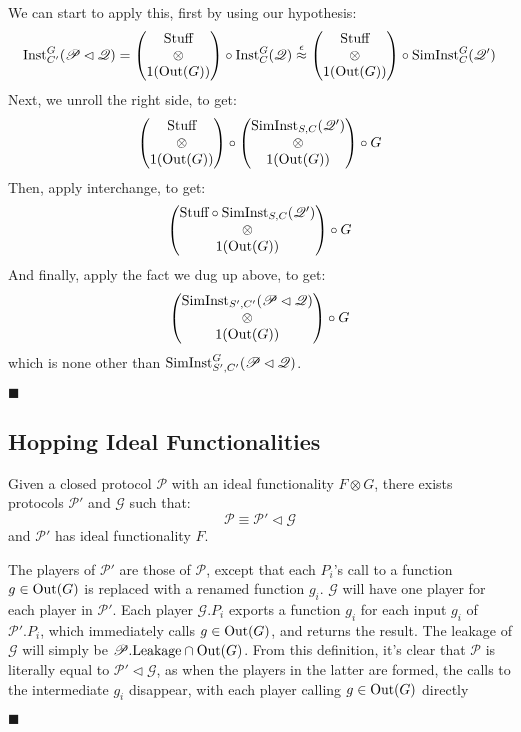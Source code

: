 \begin{theorem}
  We can start to apply this, first by using our hypothesis:
  $$
  \text{Inst}^G_{C'}(\mathscr{P} \lhd \mathscr{Q}) =
  \begin{pmatrix}
    \text{Stuff}\cr
    \otimes\cr
    1(\text{Out}(G))
  \end{pmatrix}
  \circ \text{Inst}^G_C(\mathscr{Q})
  \overset{\epsilon}{\approx}
  \begin{pmatrix}
    \text{Stuff}\cr
    \otimes\cr
    1(\text{Out}(G))
  \end{pmatrix}
  \circ \text{SimInst}^G_C(\mathscr{Q}')
  $$
  Next, we unroll the right side, to get:
  $$
  \begin{pmatrix}
    \text{Stuff}\cr
    \otimes\cr
    1(\text{Out}(G))
  \end{pmatrix}
  \circ
  \begin{pmatrix}
    \text{SimInst}_{S, C}(\mathscr{Q}')\cr
    \otimes\cr
    1(\text{Out}(G))
  \end{pmatrix}
  \circ
  G
  $$
  Then, apply interchange, to get:
  $$
  \begin{pmatrix}
    \text{Stuff} \circ \text{SimInst}_{S, C}(\mathscr{Q}')\cr
    \otimes\cr
    1(\text{Out}(G))
  \end{pmatrix}
  \circ
  G
  $$
  And finally, apply the fact we dug up above, to get:
  $$
  \begin{pmatrix}
    \text{SimInst}_{S', C'}(\mathscr{P} \lhd \mathscr{Q})\cr
    \otimes\cr
    1(\text{Out}(G))
  \end{pmatrix}
  \circ
  G
  $$
  which is none other than $\text{SimInst}^G_{S', C'}(\mathscr{P} \lhd \mathscr{Q})$.

  $\blacksquare$
\end{theorem}

\subsection{Hopping Ideal Functionalities}

\begin{lemma}
  Given a closed protocol $\mathscr{P}$ with an ideal functionality $F \otimes G$,
  there exists protocols $\mathscr{P}'$ and $\mathscr{G}$
  such that:
  $$
  \mathscr{P} \equiv \mathscr{P}' \lhd \mathscr{G}
  $$
  and $\mathscr{P}'$ has ideal functionality $F$.


   The players of $\mathscr{P}'$ are those of $\mathscr{P}$,
  except that each $P_i$'s call to a function $g \in \text{Out}(G)$ is replaced with
  a renamed function $g_i$.
  $\mathscr{G}$ will have one player for each player in $\mathscr{P}'$.
  Each player $\mathscr{G}.P_i$ exports a function $g_i$ for each input
  $g_i$ of $\mathscr{P}'.P_i$, which immediately calls $g \in \text{Out}(G)$,
  and returns the result.
  The leakage of $\mathscr{G}$ will simply be $\mathscr{P}.\text{Leakage} \cap \text{Out}(G)$.
  From this definition, it's clear that $\mathscr{P}$ is literally equal
  to $\mathscr{P}' \lhd \mathscr{G}$, as when the players in the latter
  are formed, the calls to the intermediate $g_i$ disappear,
  with each player calling $g \in \text{Out}(G)$ directly

  $\blacksquare$
\end{lemma}

